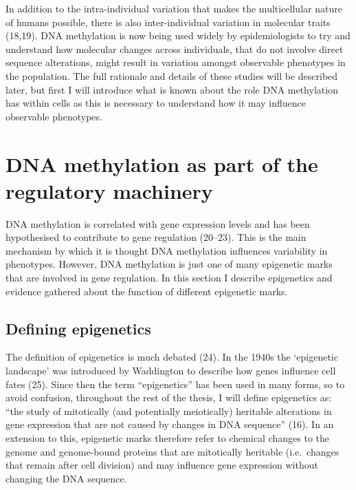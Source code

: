 \documentclass[11pt,twoside]{bristolthesis}
\begin{document}
In addition to the intra-individual variation that makes the multicellular nature of humans possible, there is also inter-individual variation in molecular traits (18,19). DNA methylation is now being used widely by epidemiologists to try and understand how molecular changes across individuals, that do not involve direct sequence alterations, might result in variation amongst observable phenotypes in the population. The full rationale and details of these studies will be described later, but first I will introduce what is known about the role DNA methylation has within cells as this is necessary to understand how it may influence observable phenotypes.

\hypertarget{dnam-as-part-of-regulation}{%
\section{DNA methylation as part of the regulatory machinery}\label{dnam-as-part-of-regulation}}

DNA methylation is correlated with gene expression levels and has been hypothesised to contribute to gene regulation (20--23). This is the main mechanism by which it is thought DNA methylation influences variability in phenotypes. However, DNA methylation is just one of many epigenetic marks that are involved in gene regulation. In this section I describe epigenetics and evidence gathered about the function of different epigenetic marks.

\hypertarget{defining-epigenetics}{%
\subsection{Defining epigenetics}\label{defining-epigenetics}}

The definition of epigenetics is much debated (24). In the 1940s the `epigenetic landscape' was introduced by Waddington to describe how genes influence cell fates (25). Since then the term ``epigenetics'' has been used in many forms, so to avoid confusion, throughout the rest of the thesis, I will define epigenetics as: ``the study of mitotically (and potentially meiotically) heritable alterations in gene expression that are not caused by changes in DNA sequence'' (16). In an extension to this, epigenetic marks therefore refer to chemical changes to the genome and genome-bound proteins that are mitotically heritable (i.e.~changes that remain after cell division) and may influence gene expression without changing the DNA sequence.
\end{document}
